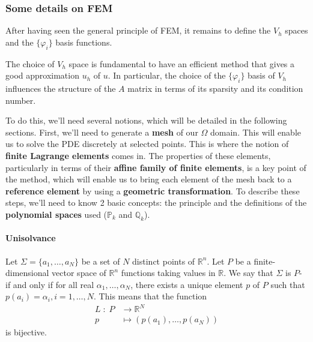 \subsubsection{Some details on FEM}

After having seen the general principle of FEM, it remains to define the $V_h$ spaces and the $\{\varphi_i\}$ basis functions.

\begin{Rem}
	The choice of $V_h$ space is fundamental to have an efficient method that gives a good approximation $u_h$ of $u$. In particular, the choice of the $\{\varphi_i\}$ basis of $V_h$ influences the structure of the $A$ matrix in terms of its sparsity and its condition number.
\end{Rem}


To do this, we'll need several notions, which will be detailed in the following sections. First, we'll need to generate a \textbf{mesh} of our $\Omega$ domain. This will enable us to solve the PDE discretely at selected points. This is where the notion of \textbf{finite Lagrange elements} comes in. The properties of these elements, particularly in terms of their \textbf{affine family of finite elements}, is a key point of the method, which will enable us to bring each element of the mesh back to a \textbf{reference element} by using a \textbf{geometric transformation}. To describe these steps, we'll need to know 2 basic concepts: the \textbf{} principle and the definitions of the \textbf{polynomial spaces} used ($\mathbb{P}_k$ and $\mathbb{Q}_k$).

\paragraph{Unisolvance}

\begin{Def}
	Let $\Sigma=\{a_1,\dots,a_N\}$ be a set of $N$ distinct points of $\mathbb{R}^n$. Let $P$ be a finite-dimensional vector space of $\mathbb{R}^n$ functions taking values in $\mathbb{R}$. We say that $\Sigma$ is $P$- if and only if for all real $\alpha_1,\dots,\alpha_N$, there exists a unique element $p$ of $P$ such that $p(a_i)=\alpha_i,i=1,\dots,N$. 
	This means that the function
	\begin{align*}
		L \; : \; P &\rightarrow \mathbb{R}^N \\
		p &\mapsto(p(a_1),\dots,p(a_N))
	\end{align*}
	is bijective.
\end{Def}

